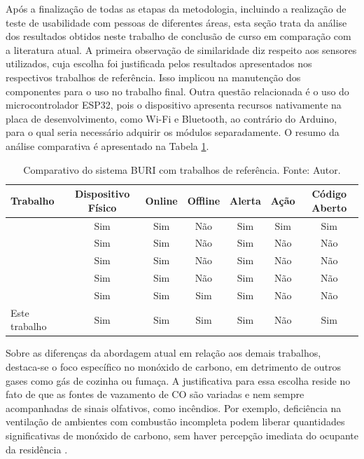 Após a finalização de todas as etapas da metodologia, incluindo a realização de teste de usabilidade com pessoas de diferentes áreas, esta seção trata da análise dos resultados obtidos 
neste trabalho de conclusão de curso em comparação com a literatura atual. A primeira observação de similaridade diz respeito aos sensores utilizados, cuja escolha foi justificada pelos resultados 
apresentados nos respectivos trabalhos de referência. Isso implicou na manutenção dos componentes para o uso no trabalho final. Outra questão relacionada é o uso do microcontrolador ESP32, pois o dispositivo apresenta 
recursos nativamente na placa de desenvolvimento, como Wi-Fi e Bluetooth, ao contrário do Arduino, para o qual seria necessário adquirir os módulos separadamente. O resumo da análise comparativa é apresentado na Tabela \ref{tab:trabalhos-comparativo}.

\begin{table}[htbp]
    \centering
    \caption{Comparativo do sistema BURI com trabalhos de referência. Fonte: Autor.}\label{tab:trabalhos-comparativo}
    \begin{tabular}{p{4cm}|c|c|c|c|c|c}
        \toprule
        \textbf{Trabalho} & \textbf{Dispositivo Físico} & \textbf{Online} & \textbf{Offline} & \textbf{Alerta}  & \textbf{Ação} & \textbf{Código Aberto} \\ 
        \midrule
        \cite{uea-iot-deteccao-incendio} & Sim & Sim & Não & Sim & Sim & Sim \\ \midrule
        \cite{iot-monitoring-on-aws} & Sim & Sim & Não & Sim & Não  & Não \\ \midrule
        \cite{UFAMAirWorld} & Sim & Sim & Não & Sim & Não  & Não \\ \midrule
        \cite{tbRelacionado4NovelEmbeddedSystem} & Sim & Sim & Não & Sim & Não & Não \\ \midrule
        \cite{alexandre-automaccao-formulas-de-leitura-sensor} & Sim & Sim & Sim & Sim & Não & Não \\ \midrule
        Este trabalho & Sim & Sim & Sim & Sim & Não & Sim \\
        \bottomrule
    \end{tabular}
\end{table}

Sobre as diferenças da abordagem atual em relação aos demais trabalhos, destaca-se o foco específico no monóxido de carbono, em detrimento de outros gases 
como gás de cozinha ou fumaça. A justificativa para essa escolha reside no fato de que as fontes de vazamento de CO são variadas e nem sempre acompanhadas de sinais 
olfativos, como incêndios. Por exemplo, deficiência na ventilação de ambientes com combustão incompleta podem liberar quantidades significativas de monóxido de carbono, sem haver percepção imediata do ocupante da residência \cite{carbon-monoxide-poisoning-varon}.

